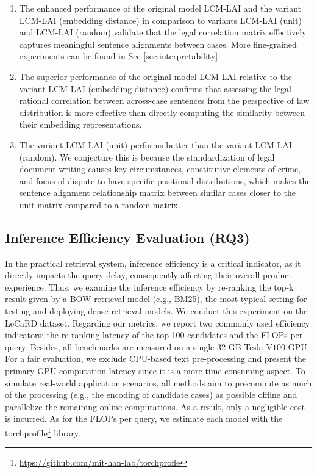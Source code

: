 \begin{enumerate}
    \item{
    The enhanced performance of the original model LCM-LAI and the variant LCM-LAI (embedding distance) in comparison to variants LCM-LAI (unit) and LCM-LAI (random) validate that the legal correlation matrix effectively captures meaningful sentence alignments between cases.
    More fine-grained experiments can be found in Sec \ref{sec:interpretability}.
    }
    \item{
    The superior performance of the original model LCM-LAI relative to the variant LCM-LAI (embedding distance) confirms that assessing the legal-rational correlation between across-case sentences from the perspective of law distribution is more effective than directly computing the similarity between their embedding representations.
    }
    \item{
    The variant LCM-LAI (unit) performs better than the variant LCM-LAI (random).
    We conjecture this is because the standardization of legal document writing causes key circumstances, constitutive elements of crime, and focus of dispute to have specific positional distributions, which makes the sentence alignment relationship matrix between similar cases closer to the unit matrix compared to a random matrix.
    }
\end{enumerate}

\subsection{Inference Efficiency Evaluation (RQ3)}
In the practical retrieval system, inference efficiency is a critical indicator, as it directly impacts the query delay, consequently affecting their overall product experience.
Thus, we examine the inference efficiency by re-ranking the top-k result given by a BOW retrieval model (e.g., BM25), the most typical setting for testing and deploying dense retrieval models.
We conduct this experiment on the LeCaRD dataset.
Regarding our metrics, we report two commonly used efficiency indicators: the re-ranking latency of the top 100 candidates and the FLOPs per query.
Besides, all benchmarks are measured on a single $32$ GB Tesla V$100$ GPU.
For a fair evaluation, we exclude CPU-based text pre-processing and present the primary GPU computation latency since it is a more time-consuming aspect.
To simulate real-world application scenarios, all methods aim to precompute as much of the processing (e.g., the encoding of candidate cases) as possible offline and parallelize the remaining online computations. 
As a result, only a negligible cost is incurred.
As for the FLOPs per query, we estimate each model with the torchprofile\footnote{\url{htps://github.com/mit-han-lab/torchprofle}} library.

